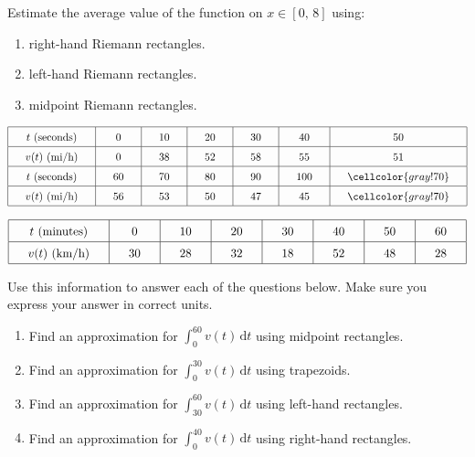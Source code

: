Estimate the average value of the function on $x \in [0, \, 8]$ using: 
\begin{enumerate}[label=\hspace{11pt}(\alph*), align=left, leftmargin=*, labelsep=0.25em]
    \item right-hand Riemann rectangles.
    \item left-hand Riemann rectangles.
    \item midpoint Riemann rectangles.
\end{enumerate} \vspace{11pt}

 \begin{align*}
    \arraycolsep=16.5pt\def\arraystretch{1.5}
    \begin{array}{|c|c|c|c|c|c|c|}
        \hline
        t \text{ (seconds)} & 0 & 10 & 20 & 30 & 40 & 50 \\ \hline
        v(t) \text{ (mi/h)} & 0 & 38 & 52 & 58 & 55 & 51 \\ \hline
        t \text{ (seconds)} & 60 & 70 & 80 & 90 & 100 & \cellcolor{gray!70}\\ \hline
        v(t) \text{ (mi/h)} & 56 & 53 & 50 & 47 & 45 & \cellcolor{gray!70} \\ 
        \hline
    \end{array}
\end{align*} 

 \begin{align*}
    \arraycolsep=16.5pt\def\arraystretch{1.5}
    \begin{array}{|c|c|c|c|c|c|c|c|}
        \hline
        t \text{ (minutes)} & 0 & 10 & 20 & 30 & 40 & 50 & 60 \\ \hline
        v(t) \text{ (km/h)} & 30 & 28 & 32 & 18 & 52 & 48 & 28 \\
        \hline
    \end{array}
\end{align*}

Use this information to answer each of the questions below. Make sure you express your answer in correct units. 
\begin{enumerate}[label=\hspace{11pt}(\alph*), align=left, leftmargin=*, labelsep=0.25em]
    \item Find an approximation for $\int_0^{60} v(t) \,\mathrm{d}t$ using midpoint rectangles. 
    \item Find an approximation for $\int_0^{30} v(t) \,\mathrm{d}t$ using trapezoids. 
    \item Find an approximation for $\int_{30}^{60} v(t) \,\mathrm{d}t$ using left-hand rectangles.
    \item Find an approximation for $\int_{0}^{40} v(t) \,\mathrm{d}t$ using right-hand rectangles.
\end{enumerate} \vspace{11pt}

